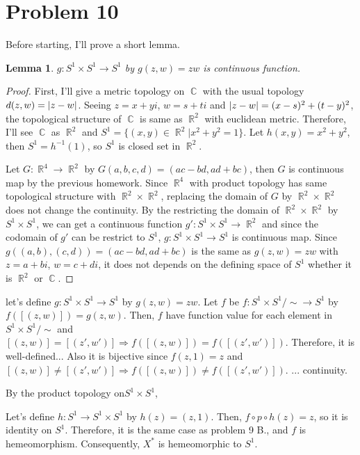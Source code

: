 \documentclass{article}
\DeclareMathOperator{\cc}{\mathbb{C}}
\DeclareMathOperator{\rr}{\mathbb{R}}
\DeclarePairedDelimiter\abs{\lvert}{\rvert}%
\newtheorem{lemma}{Lemma}
\begin{document}
\section*{Problem 10}
Before starting, I'll prove a short lemma.
\begin{lemma}
$g:S^1\times S^1\rightarrow S^1$ by $g(z,w)=zw$ is continuous function.
\end{lemma}
\begin{proof}
First, I'll give a metric topology on $\cc$ with the usual topology $d(z,w)=\abs{z-w}$. Seeing $z=x+yi$, $w=s+ti$ and $\abs{z-w}=(x-s)^2+(t-y)^2$, the topological structure of $\cc$ is same as $\rr^2$ with euclidean metric. Therefore, I'll see $\cc$ as $\rr^2$ and $S^1=\{(x,y)\in \rr^2|x^2+y^2=1\}$. Let $h(x,y)=x^2+y^2$, then $S^1=h^{-1}(1)$, so $S^1$ is closed set in $\rr^2$.

Let $G:\rr^4\rightarrow \rr^2$ by $G(a,b,c,d)=(ac-bd, ad+bc)$, then $G$ is continuous map by the previous homework. Since $\rr^4$ with product topology has same topological structure with $\rr^2\times \rr^2$, replacing the domain of $G$ by $\rr^2\times\rr^2$ does not change the continuity. By the restricting the domain of $\rr^2\times \rr^2$ by $S^1\times S^1$, we can get a continuous function $g':S^1\times S^1\rightarrow \rr^2$ and since the codomain of $g'$ can be restrict to $S^1$, $g:S^1\times S^1\rightarrow S^1$ is continuous map. Since $g((a,b),(c,d))=(ac-bd, ad+bc)$ is the same as $g(z,w)=zw$ with $z=a+bi$, $w=c+di$, it does not depends on the defining space of $S^1$ whether it is $\rr^2$ or $\cc$.
\end{proof}

 let's define $g:S^1\times S^1\rightarrow S^1$ by $g(z,w)=zw$. Let $f$ be $f:S^1\times S^1/\sim\rightarrow S^1$ by $f([(z,w)])=g(z,w)$. Then, $f$ have function value for each element in $S^1\times S^1/\sim$ and $[(z,w)]=[(z',w')]\Rightarrow f([(z,w)])=f([(z',w')])$. Therefore, it is well-defined... Also it is bijective since $f(z,1)=z$ and $[(z,w)]\neq[(z',w')]\Rightarrow  f([(z,w)])\neq f([(z',w')])$. ... continuity.

By the product topology on$S^1\times S^1$, 

Let's define $h:S^1\rightarrow S^1\times S^1$ by $h(z)=(z, 1)$. Then, $f\circ p\circ h(z)=z$, so it is identity on $S^1$. Therefore, it is the same case as problem 9 B., and $f$ is hemeomorphism. Consequently, $X^*$ is hemeomorphic to $S^1$.
\end{document}
